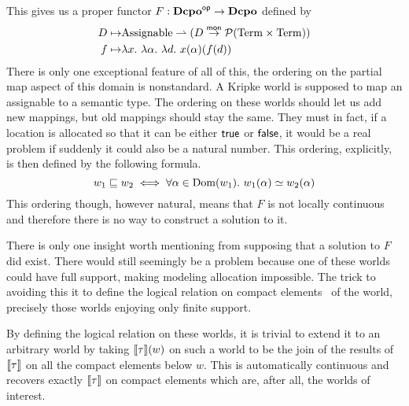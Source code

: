 This gives us a proper functor $F : \mathbf{Dcpo}^{\mathsf{op}} \to \mathbf{Dcpo}$ defined by
\begin{align*}
  D \mapsto& \assignables \pto (D \mto \pow{\term \times \term})\\
  f \mapsto& \lambda x.\ \lambda \alpha.\ \lambda d.\ x(\alpha)(f(d))
\end{align*}
There is only one exceptional feature of all of this, the ordering on
the partial map aspect of this domain is nonstandard. A Kripke world
is supposed to map an assignable to a semantic type. The ordering on
these worlds should let us add new mappings, but old mappings should
stay the same. They must in fact, if a location is allocated so that
it can be either $\mathsf{true}$ or $\mathsf{false}$, it would be a real
problem if suddenly it could also be a natural number. This ordering,
explicitly, is then defined by the following formula.
\[
  w_1 \mathrel{\sqsubseteq} w_2 \iff \forall \alpha \in \operatorname{Dom}(w_1).\ w_1(\alpha) \simeq w_2(\alpha)
\]
This ordering though, however natural, means that $F$ is not locally
continuous and therefore there is no way to construct a solution to
it.

There is only one insight worth mentioning from supposing that a
solution to $F$ did exist. There would still seemingly be a problem
because one of these worlds could have full support, making modeling
allocation impossible. The trick to avoiding this it to define the
logical relation on compact elements~\citep{TODO-COMPEDIUM} of the
world, precisely those worlds enjoying only finite support.

By defining the logical relation on these worlds, it is trivial to
extend it to an arbitrary world by taking $\llbracket \tau \rrbracket(w)$ on such a
world to be the join of the results of $\llbracket \tau \rrbracket$ on all the compact
elements below $w$. This is automatically continuous and recovers
exactly $\llbracket \tau \rrbracket$ on compact elements which are, after all, the
worlds of interest.


